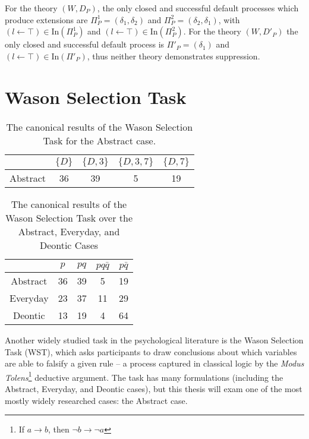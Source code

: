For the theory $(W,D_P)$, the only closed and successful default processes which produce extensions are $\Pi_P^1=(\delta_1,\delta_2)$ and $\Pi^2_P=(\delta_2,\delta_1)$, with $(l\leftarrow \top)\in \text{In}(\Pi^1_P)$ and $(l\leftarrow \top)\in \text{In}(\Pi^2_P)$. For the theory $(W,D'_P)$ the only closed and successful default process is $\Pi'_P=(\delta_1)$ and $(l\leftarrow \top)\in \text{In}(\Pi'_P)$, thus neither theory demonstrates suppression.

\section{Wason Selection Task}\label{ssec:wst}
\begin{table}
\begin{center}


\begin{tabular}{ c c c c c}
  & \textbf{$\{D\}$} & \textbf{$\{D,3\}$} & \textbf{$\{D,3,7\}$} & \textbf{$\{D,7\}$}\\ 
  \hline
 Abstract & 36 & 39 & 5 & 19\\  
\end{tabular}
\caption{The canonical results of the Wason Selection Task for the Abstract case.}
\label{tbl:can}
\end{center}
\end{table}

\begin{table}
\begin{center}
\begin{tabular}{ c c c c c}
  & \textbf{$p$} & \textbf{$pq$} & \textbf{$pq\bar{q}$} & \textbf{$p\bar{q}$}\\ 
  \hline
 Abstract & 36 & 39 & 5 & 19\\  
 Everyday & 23 & 37 & 11 & 29\\  
 Deontic & 13 & 19 & 4 & 64
\end{tabular}
\caption{The canonical results of the Wason Selection Task over the Abstract, Everyday, and Deontic Cases}
\label{tbl:can_full}
\end{center}
\end{table}

Another widely studied task in the psychological literature is the Wason Selection Task (WST), which asks participants to draw conclusions about which variables are able to falsify a given rule -- a process captured in classical logic by the \textit{Modus Tolens}\footnote{If $a\rightarrow b$, then $\lnot b \rightarrow \lnot a$} deductive argument. The task has many formulations (including the Abstract, Everyday, and Deontic cases), but this thesis will exam one of the most mostly widely researched cases: the Abstract case. 

